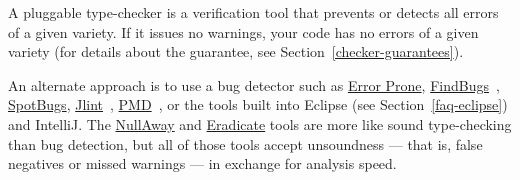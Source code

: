 




A pluggable type-checker
is a verification tool that prevents or detects all errors of a given
variety.  If it issues no warnings, your code has no errors of a given
variety (for details about the guarantee, see
Section~\ref{checker-guarantees}).

An alternate approach is to use a bug detector such as
\href{https://errorprone.info/}{Error Prone},
\href{https://findbugs.sourceforge.net/}{FindBugs}~\cite{HovemeyerP2004,HovemeyerSP2005},
\href{https://github.com/spotbugs/spotbugs}{SpotBugs},
\href{https://jlint.sourceforge.net/}{Jlint}~\cite{Artho2001},
\href{https://pmd.github.io/}{PMD}~\cite{Copeland2005},
or the
tools built into Eclipse (see Section~\ref{faq-eclipse}) and IntelliJ\@.
The \href{https://github.com/uber/NullAway}{NullAway} and
\href{https://fbinfer.com/docs/1.1.0/checker-eradicate/}{Eradicate} tools are more
like sound type-checking than bug detection, but all of those tools accept
unsoundness --- that is, false negatives or missed warnings --- in exchange
for analysis speed.

